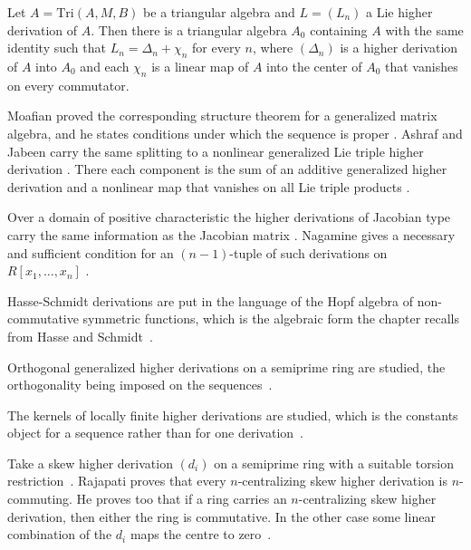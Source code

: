 \begin{theorem}\label{thm:higher:lie-higher-triangular}
Let $A=\mathrm{Tri}(A,M,B)$ be a triangular algebra and $L=(L_{n})$ a Lie higher
derivation of $A$. Then there is a triangular algebra $A_{0}$ containing $A$ with
the same identity such that $L_{n}=\Delta_{n}+\chi_{n}$ for every $n$, where
$(\Delta_{n})$ is a higher derivation of $A$ into $A_{0}$ and each $\chi_{n}$ is a
linear map of $A$ into the center of $A_{0}$ that vanishes on every commutator.
\end{theorem}

Moafian proved the corresponding structure theorem for a generalized matrix
algebra, and he states conditions under which the sequence is proper
\cite[Theorem~4.4, p.~12]{Moafian2017}. Ashraf and Jabeen carry the same
splitting to a nonlinear generalized Lie triple higher derivation
\cite[p.~1]{AshrafJabeen2018}. There each component is the sum of an additive
generalized higher derivation and a nonlinear map that vanishes on all Lie
triple products \cite[Theorem~3.1, p.~5]{AshrafJabeen2018}.

Over a domain of positive characteristic the higher derivations of Jacobian
type carry the same information as the Jacobian matrix \cite[Abstract,
p.~1]{Nagamine2019HigherJacobian}. Nagamine gives a necessary and sufficient
condition for an $(n-1)$-tuple of such derivations on $R[x_1,\dots,x_n]$
\cite[Abstract, p.~1]{Nagamine2019HigherJacobian}.

Hasse-Schmidt derivations are put in the language of the Hopf algebra of
non-commutative symmetric functions, which is the algebraic form the chapter
recalls from Hasse and Schmidt~\cite{WlHasseSchmidtDerivations2012}.

Orthogonal generalized higher derivations on a semiprime ring are studied, the
orthogonality being imposed on the
sequences~\cite{WlOrthogonalGeneralizedHigherDer2021}.

The kernels of locally finite higher derivations are studied, which is the
constants object for a sequence rather than for one
derivation~\cite{WlNotesOnTheKernelsOfLocallyFini2018}.

Take a skew higher derivation $(d_i)$ on a semiprime ring with a suitable
torsion restriction~\cite{WlNCommutingSkewHigherDerivation2020}. Rajapati proves that every $n$-centralizing skew higher
derivation is $n$-commuting. He proves too that if a ring carries an %
$n$-centralizing
skew higher derivation, then either the ring is commutative. In the other case %
some linear
combination of the $d_i$ maps the centre to
zero~\cite{WlNCommutingSkewHigherDerivation2020}.

